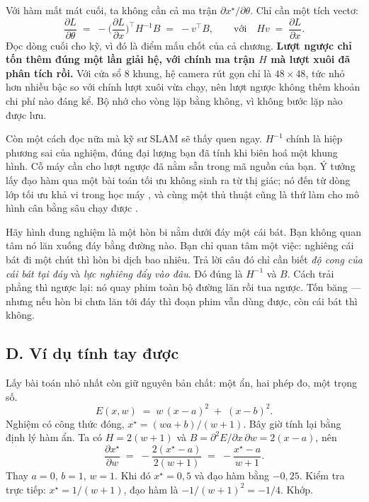 \documentclass[../../deep_learning.tex]{subfiles}
\begin{document}
Với hàm mất mát cuối, ta không cần cả ma trận \(\partial x^\star/\partial\theta\). Chỉ cần một tích vectơ:
\[
\frac{\partial L}{\partial\theta} \;=\; -\Big(\frac{\partial L}{\partial x}\Big)^{\!\top} H^{-1} B \;=\; -v^\top B,
\qquad\text{với}\quad H v \;=\; \frac{\partial L}{\partial x}.
\]
Đọc dòng cuối cho kỹ, vì đó là điểm mấu chốt của cả chương. \textbf{Lượt ngược chỉ tốn thêm đúng một lần giải hệ, với chính ma trận \(H\) mà lượt xuôi đã phân tích rồi.} Với cửa sổ 8 khung, hệ camera rút gọn chỉ là \(48\times48\), tức nhỏ hơn nhiều bậc so với chính lượt xuôi vừa chạy, nên lượt ngược không thêm khoản chi phí nào đáng kể. Bộ nhớ cho vòng lặp bằng không, vì không bước lặp nào được lưu.

Còn một cách đọc nữa mà kỹ sư SLAM sẽ thấy quen ngay. \(H^{-1}\) chính là hiệp phương sai của nghiệm, đúng đại lượng bạn đã tính khi biên hoá một khung hình. Cỗ máy cần cho lượt ngược đã nằm sẵn trong mã nguồn của bạn. Ý tưởng lấy đạo hàm qua một bài toán tối ưu không sinh ra từ thị giác; nó đến từ dòng lớp tối ưu khả vi trong học máy \cite{amos2017optnet,agrawal2019cvxpylayers}, và cùng một thủ thuật cũng là thứ làm cho mô hình cân bằng sâu chạy được \cite{bai2019deq}.

\begin{trucgiac}
Hãy hình dung nghiệm là một hòn bi nằm dưới đáy một cái bát. Bạn không quan tâm nó lăn xuống đáy bằng đường nào. Bạn chỉ quan tâm một việc: nghiêng cái bát đi một chút thì hòn bi dịch bao nhiêu. Trả lời câu đó chỉ cần biết \emph{độ cong của cái bát tại đáy} và \emph{lực nghiêng đẩy vào đâu}. Đó đúng là \(H^{-1}\) và \(B\). Cách trải phẳng thì ngược lại: nó quay phim toàn bộ đường lăn rồi tua ngược. Tốn băng --- nhưng nếu hòn bi chưa lăn tới đáy thì đoạn phim vẫn dùng được, còn cái bát thì không.
\end{trucgiac}

\subsection{D. Ví dụ tính tay được}
Lấy bài toán nhỏ nhất còn giữ nguyên bản chất: một ẩn, hai phép đo, một trọng số.
\[
E(x,w) \;=\; w\,(x-a)^2 \;+\; (x-b)^2 .
\]
Nghiệm có công thức đóng, \(x^\star = (wa+b)/(w+1)\). Bây giờ tính lại bằng định lý hàm ẩn. Ta có \(H = 2(w+1)\) và \(B = \partial^2E/\partial x\,\partial w = 2(x-a)\), nên
\[
\frac{\partial x^\star}{\partial w} \;=\; -\frac{2(x^\star-a)}{2(w+1)} \;=\; -\frac{x^\star-a}{w+1}.
\]
Thay \(a=0\), \(b=1\), \(w=1\). Khi đó \(x^\star = 0{,}5\) và đạo hàm bằng \(-0{,}25\). Kiểm tra trực tiếp: \(x^\star = 1/(w+1)\), đạo hàm là \(-1/(w+1)^2 = -1/4\). Khớp.
\end{document}
